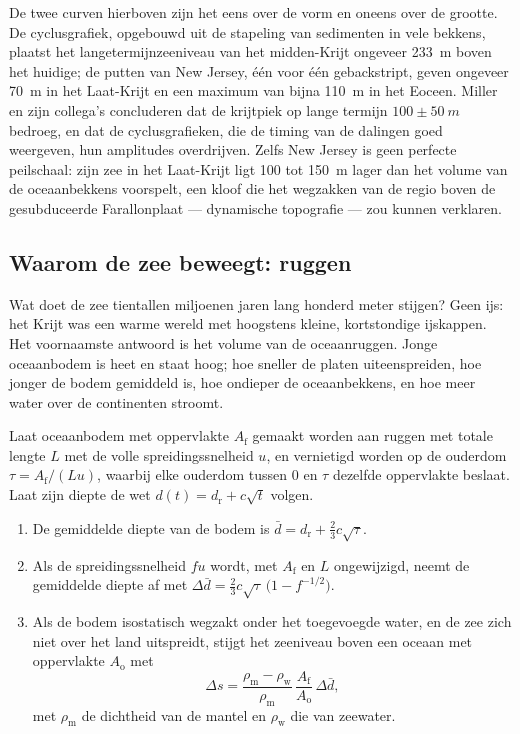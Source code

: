 De twee curven hierboven zijn het eens over de vorm en oneens over de grootte. De cyclusgrafiek, opgebouwd uit
de stapeling van sedimenten in vele bekkens, plaatst het langetermijnzeeniveau van het midden-Krijt
ongeveer \qty{233}{m} boven het huidige; de putten van New Jersey, één voor één gebackstript, geven ongeveer
\qty{70}{m} in het Laat-Krijt en een maximum van bijna \qty{110}{m} in het Eoceen. Miller en zijn
collega's concluderen dat de krijtpiek op lange termijn $100 \pm \qty{50}{m}$ bedroeg, en dat de
cyclusgrafieken, die de timing van de dalingen goed weergeven, hun amplitudes overdrijven. Zelfs New Jersey
is geen perfecte peilschaal: zijn zee in het Laat-Krijt ligt 100 tot \qty{150}{m} lager dan het volume van
de oceaanbekkens voorspelt, een kloof die het wegzakken van de regio boven de gesubduceerde
Farallonplaat --- dynamische topografie --- zou kunnen verklaren.

\subsection*{Waarom de zee beweegt: ruggen}

Wat doet de zee tientallen miljoenen jaren lang honderd meter stijgen? Geen ijs: het Krijt
was een warme wereld met hoogstens kleine, kortstondige ijskappen. Het voornaamste antwoord is het volume van
de oceaanruggen. Jonge oceaanbodem is heet en staat hoog; hoe sneller de platen uiteenspreiden, hoe
jonger de bodem gemiddeld is, hoe ondieper de oceaanbekkens, en hoe meer water over
de continenten stroomt.

\begin{proposition}\label{prop:b2:phanerozoic-earth:ridge}
Laat oceaanbodem met oppervlakte $A_{\text{f}}$ gemaakt worden aan ruggen met totale lengte $L$ met de volle
spreidingssnelheid $u$, en vernietigd worden op de ouderdom $\tau = A_{\text{f}}/(Lu)$, waarbij elke ouderdom tussen 0
en $\tau$ dezelfde oppervlakte beslaat. Laat zijn diepte de wet $d(t) = d_{\text{r}} + c\sqrt t$ volgen.
\begin{enumerate}
  \item De gemiddelde diepte van de bodem is $\bar d = d_{\text{r}} + \tfrac23 c\sqrt\tau$.
  \item Als de spreidingssnelheid $fu$ wordt, met $A_{\text{f}}$ en $L$ ongewijzigd, neemt de gemiddelde
        diepte af met $\Delta\bar d = \tfrac23 c\sqrt\tau\,\bigl(1 - f^{-1/2}\bigr)$.
  \item Als de bodem isostatisch wegzakt onder het toegevoegde water, en de zee zich niet
        over het land uitspreidt, stijgt het zeeniveau boven een oceaan met oppervlakte $A_{\text{o}}$ met
        \[
        \Delta s = \frac{\rho_{\text{m}} - \rho_{\text{w}}}{\rho_{\text{m}}}\,
        \frac{A_{\text{f}}}{A_{\text{o}}}\,\Delta\bar d ,
        \]
        met $\rho_{\text{m}}$ de dichtheid van de mantel en $\rho_{\text{w}}$ die van zeewater.
\end{enumerate}
\end{proposition}

